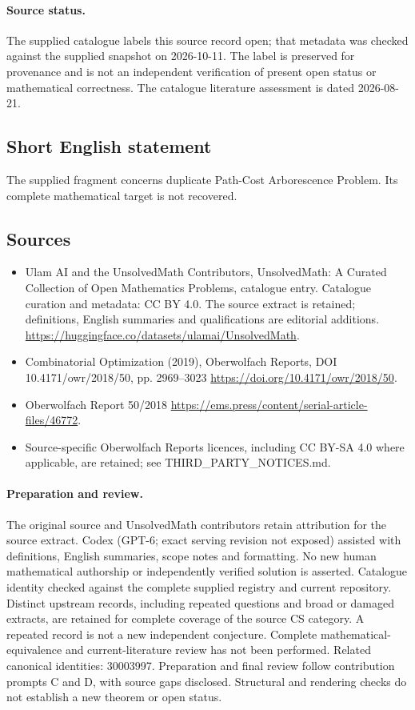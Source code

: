 \documentclass[11pt]{article}
\begin{document}
\paragraph{Source status.}
The supplied catalogue labels this source record open; that metadata was checked against the supplied snapshot on 2026-10-11. The label is preserved for provenance and is not an independent verification of present open status or mathematical correctness. The catalogue literature assessment is dated 2026-08-21.
\subsection{Short English statement}
The supplied fragment concerns duplicate Path-Cost Arborescence Problem. Its complete mathematical target is not recovered.
\subsection{Sources}
\begin{itemize}
\item[\hypertarget{source:statement:1}{S1}] Ulam AI and the UnsolvedMath Contributors, UnsolvedMath: A Curated Collection of Open Mathematics Problems, catalogue entry. Catalogue curation and metadata: CC BY 4.0. The source extract is retained; definitions, English summaries and qualifications are editorial additions.
\url{https://huggingface.co/datasets/ulamai/UnsolvedMath}.
\item[\hypertarget{source:statement:2}{S2}] Combinatorial Optimization (2019), Oberwolfach Reports, DOI 10.4171/owr/2018/50, pp. 2969--3023
\url{https://doi.org/10.4171/owr/2018/50}.
\item[\hypertarget{source:statement:3}{S3}] Oberwolfach Report 50/2018
\url{https://ems.press/content/serial-article-files/46772}.
\item Source-specific Oberwolfach Reports licences, including CC BY-SA 4.0 where applicable, are retained; see THIRD\_PARTY\_NOTICES.md.
\end{itemize}
\paragraph{Preparation and review.}
The original source and UnsolvedMath contributors retain attribution for the source extract. Codex (GPT-6; exact serving revision not exposed) assisted with definitions, English summaries, scope notes and formatting. No new human mathematical authorship or independently verified solution is asserted. Catalogue identity checked against the complete supplied registry and current repository. Distinct upstream records, including repeated questions and broad or damaged extracts, are retained for complete coverage of the source CS category. A repeated record is not a new independent conjecture. Complete mathematical-equivalence and current-literature review has not been performed. Related canonical identities: 30003997. Preparation and final review follow contribution prompts C and D, with source gaps disclosed. Structural and rendering checks do not establish a new theorem or open status.
\label{end:statement}
\end{document}
